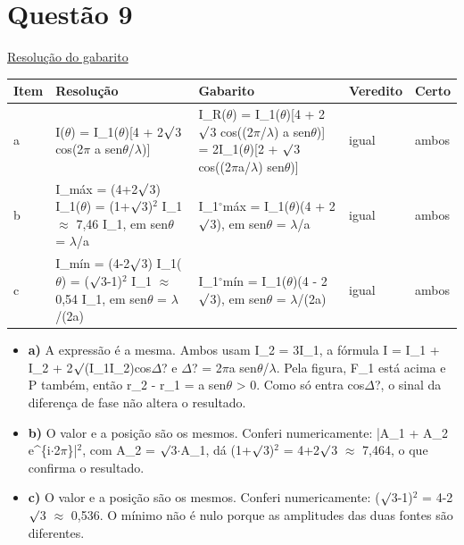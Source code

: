 \documentclass{article}%
\begin{document}
\section*{Questão 9}%
\href{https://poliedroresolve.sistemapoliedro.com.br/vestibulares/ime/2026/ime-2-fase-dia-2-24-10-2025-2-fase-dia-2/dissertativa-9-fisica-2-fase-dia-2-ime-2026}{Resolução do gabarito}\par\smallskip%
\begin{longtable}{@{}p{} p{} p{} p{} p{}@{}}\toprule Item & Resolução & Gabarito & Veredito & Certo \\ \midrule
a & I($\theta$) = I\_1($\theta$){[}4 + 2$\surd$3 cos(2$\pi$ a sen$\theta$/$\lambda$){]} & I\_R($\theta$) = I\_1($\theta$){[}4 + 2$\surd$3 cos((2$\pi$/$\lambda$) a sen$\theta$){]} = 2I\_1($\theta$){[}2 + $\surd$3 cos((2$\pi$a/$\lambda$) sen$\theta$){]} & igual & ambos \\
b & I\_máx = (4+2$\surd$3) I\_1($\theta$) = (1+$\surd$3)$^2$ I\_1 $\approx$ 7,46 I\_1, em sen$\theta$ = $\lambda$/a & I\_1$^\circ$máx = I\_1($\theta$)(4 + 2$\surd$3), em sen$\theta$ = $\lambda$/a & igual & ambos \\
c & I\_mín = (4-2$\surd$3) I\_1($\theta$) = ($\surd$3-1)$^2$ I\_1 $\approx$ 0,54 I\_1, em sen$\theta$ = $\lambda$/(2a) & I\_1$^\circ$mín = I\_1($\theta$)(4 - 2$\surd$3), em sen$\theta$ = $\lambda$/(2a) & igual & ambos \\
\bottomrule\end{longtable}%
\begin{itemize}%
\item%
\textbf{a)} A expressão é a mesma. Ambos usam I\_2 = 3I\_1, a fórmula I = I\_1 + I\_2 + 2$\surd$(I\_1I\_2)cos$\Delta$? e $\Delta$? = 2$\pi$a sen$\theta$/$\lambda$. Pela figura, F\_1 está acima e P também, então r\_2 - r\_1 = a sen$\theta$ > 0. Como só entra cos$\Delta$?, o sinal da diferença de fase não altera o resultado.%
\item%
\textbf{b)} O valor e a posição são os mesmos. Conferi numericamente: |A\_1 + A\_2 e\^{}\{i$\cdot$2$\pi$\}|$^2$, com A\_2 = $\surd$3$\cdot$A\_1, dá (1+$\surd$3)$^2$ = 4+2$\surd$3 $\approx$ 7,464, o que confirma o resultado.%
\item%
\textbf{c)} O valor e a posição são os mesmos. Conferi numericamente: ($\surd$3-1)$^2$ = 4-2$\surd$3 $\approx$ 0,536. O mínimo não é nulo porque as amplitudes das duas fontes são diferentes.%
\end{itemize}%
\end{document}
